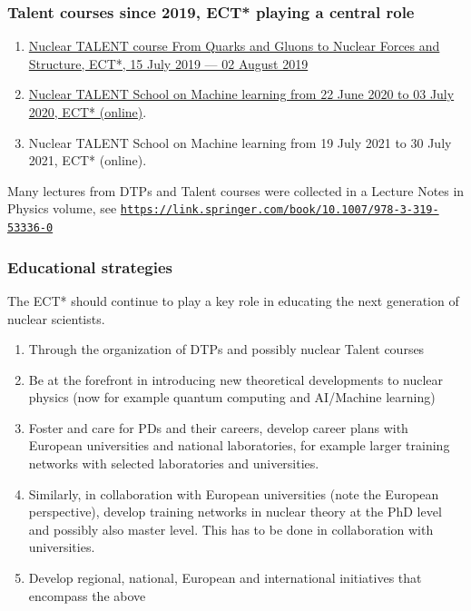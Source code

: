 \documentclass{beamer}
\begin{document}
\begin{frame}
\frametitle{Talent courses since 2019, ECT* playing a central role}

\begin{block}{}
\begin{enumerate}
\item \href{{https://www.ectstar.eu/talents/talent-2019/}}{Nuclear TALENT course From Quarks and Gluons to Nuclear Forces and Structure, ECT*, 15 July 2019 — 02 August 2019}

\item \href{{https://www.ectstar.eu/talents/talent-school-special-edition-2020/}}{Nuclear TALENT School on Machine learning from 22 June 2020 to 03 July 2020, ECT* (online)}. 

\item Nuclear TALENT School on Machine learning from 19 July 2021 to  30 July 2021, ECT* (online). 
\end{enumerate}

\noindent
\end{block}

Many lectures from DTPs and Talent courses were collected in a Lecture Notes in Physics volume, see \href{{https://link.springer.com/book/10.1007/978-3-319-53336-0}}{\nolinkurl{https://link.springer.com/book/10.1007/978-3-319-53336-0}}
\end{frame}

\begin{frame}
\frametitle{Educational strategies}

The ECT* should continue to play a key role in educating the next generation of nuclear scientists.

\begin{enumerate}
\item Through the organization of DTPs and possibly nuclear Talent courses

\item Be at the forefront in introducing new theoretical developments to nuclear physics (now for example quantum computing and AI/Machine learning)

\item Foster and care for PDs and their careers, develop career plans with European universities and national laboratories, for example larger training networks with selected laboratories and universities. 

\item Similarly, in collaboration with European universities (note the European perspective), develop training networks in nuclear theory at the PhD level and possibly also master level. This has to be done in collaboration with universities.

\item Develop regional, national, European and international initiatives that encompass the above
\end{enumerate}

\noindent
\end{frame}
\end{document}
